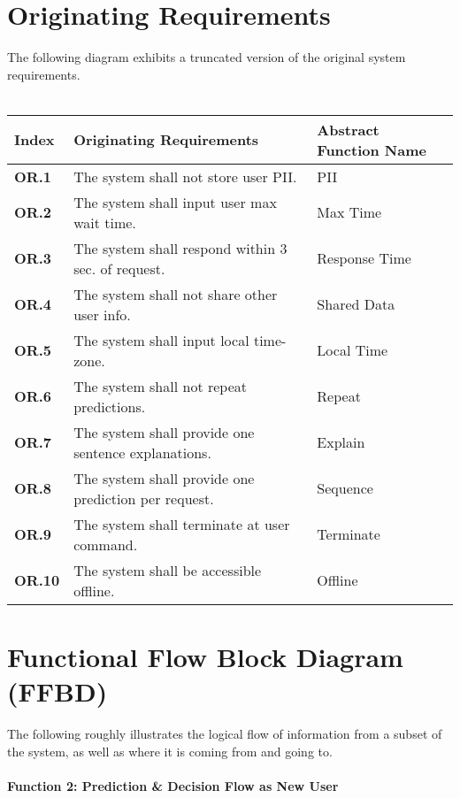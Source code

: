 \documentclass{article}
\begin{document}
\section*{Originating Requirements}
The following diagram exhibits a truncated version of the original system requirements.
\\~\\
\begin{tabular}{ | m{28pt} | m{232pt}| m{124pt} | }
  \hline
  \textbf{Index} & \textbf{Originating Requirements} & \textbf{Abstract Function Name} \\ 
  \hline
  \textbf{OR.1} & The system shall not store user PII. &  PII \\ 
  \hline
  \textbf{OR.2} & The system shall input user max wait time. & Max Time \\ 
  \hline
  \textbf{OR.3} & The system shall respond within 3 sec. of request. & Response Time \\ 
  \hline
  \textbf{OR.4} & The system shall not share other user info. & Shared Data \\ 
  \hline
  \textbf{OR.5} & The system shall input local time-zone. & Local Time \\ 
  \hline
  \textbf{OR.6} & The system shall not repeat predictions. & Repeat \\ 
  \hline
  \textbf{OR.7} & The system shall provide one sentence explanations. & Explain \\ 
  \hline
  \textbf{OR.8} & The system shall provide one prediction per request. & Sequence \\ 
  \hline
  \textbf{OR.9} & The system shall terminate at user command. & Terminate \\ 
  \hline
  \textbf{OR.10} & The system shall be accessible offline. & Offline \\ 
  \hline
\end{tabular}

\newpage
\section*{Functional Flow Block Diagram (FFBD)}

The following roughly illustrates the logical flow of information from a subset of the system, as well as where it is coming from and going to.
\\~\\
\textbf{Function 2: Prediction \& Decision Flow as New User}
\end{document}
